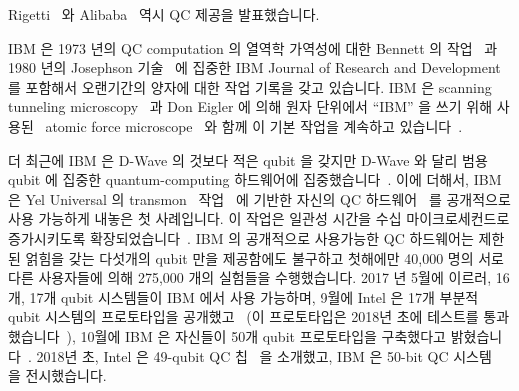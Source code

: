 Rigetti~\cite{Rigetti2018QC}
와 Alibaba~\cite{ZenSoo2018AlibabaQC}
역시 QC 제공을 발표했습니다.

IBM 은 1973 년의 QC computation 의 열역학 가역성에 대한 Bennett 의
작업~\cite{Bennett:1973:LRC:1664562.1664568} 과 1980 년의 Josephson
기술~\cite{1980:1663086} 에 집중한 IBM Journal of Research and Development 를
포함해서 오랜기간의 양자에 대한 작업 기록을 갖고 있습니다.
IBM 은 scanning tunneling microscopy~\cite{Binnig1982SurfaceSTM} 과 Don Eigler
에 의해 원자 단위에서 ``IBM'' 을 쓰기 위해
사용된~\cite{MalcolmWBrowne1990AFM-IBM} atomic force
microscope~\cite{1986PhRvL..56..930B} 와 함께 이 기본 작업을 계속하고
있습니다~\cite{Binnig1982SurfaceSTM}.

더 최근에 IBM 은 D-Wave 의 것보다 적은 qubit 을 갖지만 D-Wave 와 달리 범용
qubit 에 집중한 quantum-computing 하드웨어에
집중했습니다~\cite{BradJones2017IBM-QC-Announce,RobertHackett2017IBM-QC-Announce,AgamShah2017IBM-QC-50-qubit,DarioGill2017IBM-Universal-QC}.
이에 더해서, IBM 은 Yel Universal 의 transmon~\cite{WikipediaTransMon}
작업~\cite{PhysRevA.76.042319} 에 기반한 자신의 QC
하드웨어~\cite{IBM2016QuantumExperience,ArsTechnica2016IBMQuantumExperience,MikeVizard2017IBM-QC-Cloud}
를 공개적으로 사용 가능하게 내놓은 첫 사례입니다.
이 작업은 일관성 시간을 수십 마이크로세컨드로 증가시키도록
확장되었습니다~\cite{PhysRevLett.107.240501,PhysRevLett.111.080502,PhysRevB.86.100506}.
IBM 의 공개적으로 사용가능한 QC 하드웨어는 제한된 얽힘을 갖는 다섯개의 qubit
만을 제공함에도 불구하고 첫해에만 40,000 명의 서로 다른 사용자들에 의해 275,000
개의 실험들을 수행했습니다.
2017 년 5월에 이르러, 16개, 17개 qubit 시스템들이 IBM 에서 사용 가능하며, 9월에
Intel 은 17개 부분적 qubit 시스템의 프로토타입을
공개했고~\cite{Intel2017delivers17qubit} (이 프로토타입은 2018년 초에 테스트를
통과했습니다~\cite{RyanFMandelbaum2018IntelQC}),
10월에 IBM 은 자신들이 50개 qubit 프로토타입을 구축했다고
밝혔습니다~\cite{WillKnight2017IBM50qubits}.
2018년 초, Intel 은 49-qubit QC 칩~\cite{JeremyHsu2018Intel50qubitsCES} 을
소개했고, IBM 은 50-bit QC 시스템~\cite{NickSummers2018IBM50qubitsCES} 을
전시했습니다.

